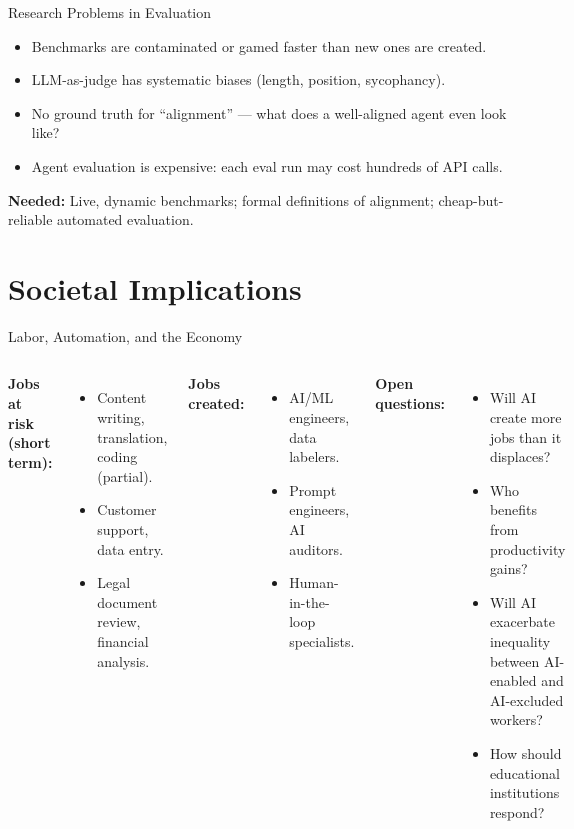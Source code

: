 \documentclass[aspectratio=169,10pt]{beamer}
\begin{document}
\begin{frame}{Research Problems in Evaluation}
  \begin{tcolorbox}[hitbox, title=The Evaluation Crisis]
    \begin{itemize}
      \item Benchmarks are contaminated or gamed faster than new ones are created.
      \item LLM-as-judge has systematic biases (length, position, sycophancy).
      \item No ground truth for ``alignment'' — what does a well-aligned agent even look like?
      \item Agent evaluation is expensive: each eval run may cost hundreds of API calls.
    \end{itemize}
    \textbf{Needed:} Live, dynamic benchmarks; formal definitions of alignment;
    cheap-but-reliable automated evaluation.
  \end{tcolorbox}
\end{frame}

\section{Societal Implications}

\begin{frame}{Labor, Automation, and the Economy}
  \begin{columns}[T]
      \textbf{Jobs at risk (short term):}
      \begin{itemize}
        \item Content writing, translation, coding (partial).
        \item Customer support, data entry.
        \item Legal document review, financial analysis.
      \end{itemize}
      \vspace{0.4em}
      \textbf{Jobs created:}
      \begin{itemize}
        \item AI/ML engineers, data labelers.
        \item Prompt engineers, AI auditors.
        \item Human-in-the-loop specialists.
      \end{itemize}
      \textbf{Open questions:}
      \begin{itemize}
        \item Will AI create more jobs than it displaces?
        \item Who benefits from productivity gains?
        \item Will AI exacerbate inequality between AI-enabled and AI-excluded workers?
        \item How should educational institutions respond?
      \end{itemize}
  \end{columns}
\end{frame}
\end{document}
